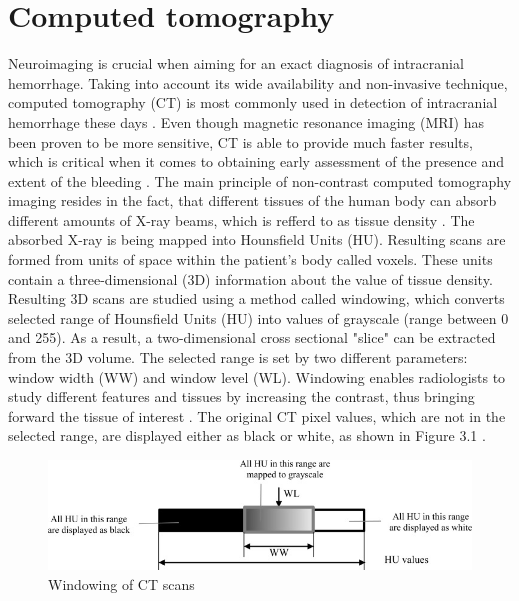 \section{Computed tomography}
Neuroimaging is crucial when aiming for an exact diagnosis of intracranial hemorrhage.  Taking into account its wide availability and non-invasive technique, computed tomography (CT) is most commonly used in detection of intracranial hemorrhage these days \cite{imagingICH}. Even though magnetic resonance imaging (MRI) has been proven to be more sensitive, CT is able to provide much faster results, which is critical when it comes to obtaining early assessment of the presence and extent of the bleeding \cite{imagingAfterBrainInjury}. The main principle of non-contrast computed tomography imaging resides in the fact, that different tissues of the human body can absorb different amounts of X-ray beams, which is refferd to as tissue density \cite{principlesOfCT}. The absorbed X-ray is being mapped into Hounsfield Units (HU). Resulting scans are formed from units of space within the patient's body called voxels. These units contain a three-dimensional (3D) information about the value of tissue density. Resulting 3D scans are studied using a method called windowing, which converts selected range of Hounsfield Units (HU) into values of grayscale (range between 0 and 255).  As a result, a two-dimensional cross sectional "slice" can be extracted from the 3D volume. The selected range is set by two different parameters: window width (WW) and window level (WL). Windowing enables radiologists to study different features and tissues by increasing the contrast, thus bringing forward the tissue of interest \cite{windowClassBiomArt}. The original CT pixel values, which are not in the selected range, are displayed either as black or white, as shown in Figure 3.1 .

\begin{figure}[h]
\begin{centering}
\includegraphics[width=15cm]{assets/images/windowingHU}
\par\end{centering}
\caption{Windowing of CT scans \cite{windowClassBiomArt}
\label{fig:windowing}}
\end{figure}

